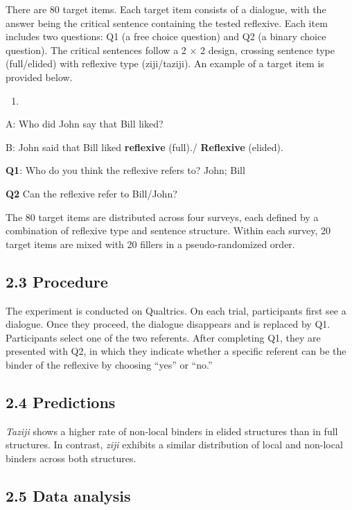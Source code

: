 \documentclass[
  man]{apa6}
\providecommand{\tightlist}{%
  \setlength{\itemsep}{0pt}\setlength{\parskip}{0pt}}
\begin{document}
There are 80 target items. Each target item consists of a dialogue, with the answer being the critical sentence containing the tested reflexive. Each item includes two questions: Q1 (a free choice question) and Q2 (a binary choice question). The critical sentences follow a 2 × 2 design, crossing sentence type (full/elided) with reflexive type (ziji/taziji). An example of a target item is provided below.

\begin{enumerate}
\def\labelenumi{(\arabic{enumi})}
\setcounter{enumi}{2}
\tightlist
\item
\end{enumerate}

A: Who did John say that Bill liked?

B: John said that Bill liked \textbf{reflexive} (full)./ \textbf{Reflexive} (elided).

\textbf{Q1}: Who do you think the reflexive refers to? John; Bill

\textbf{Q2} Can the reflexive refer to Bill/John?

The 80 target items are distributed across four surveys, each defined by a combination of reflexive type and sentence structure. Within each survey, 20 target items are mixed with 20 fillers in a pseudo-randomized order.

\subsection{2.3 Procedure}\label{procedure}

The experiment is conducted on Qualtrics. On each trial, participants first see a dialogue. Once they proceed, the dialogue disappears and is replaced by Q1. Participants select one of the two referents. After completing Q1, they are presented with Q2, in which they indicate whether a specific referent can be the binder of the reflexive by choosing ``yes'' or ``no.''

\subsection{2.4 Predictions}\label{predictions}

\emph{Taziji} shows a higher rate of non-local binders in elided structures than in full structures. In contrast, \emph{ziji} exhibits a similar distribution of local and non-local binders across both structures.

\subsection{2.5 Data analysis}\label{data-analysis}
\end{document}
